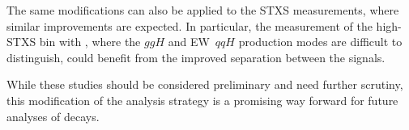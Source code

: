 The same modifications can also be applied to the STXS measurements, where similar improvements are expected. In particular, the measurement of the high-\pT STXS bin with \TwoJet, where the $ggH$ and EW~$qqH$ production modes are difficult to distinguish, could benefit from the improved separation between the signals.

While these studies should be considered preliminary and need further scrutiny, this modification of the \TwoJet analysis strategy is a promising way forward for future analyses of \HWW decays.





